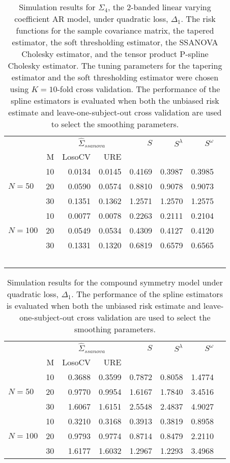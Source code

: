 \documentclass[12pt]{article}
\theoremstyle{definition}
\begin{document}
\begin{table}[H]
\centering
\caption{Simulation results for $\Sigma_4$, the 2-banded linear varying coefficient AR model, under quadratic loss, $\Delta_1$. The risk functions for the sample covariance matrix, the tapered estimator, the soft thresholding estimator, the SSANOVA Cholesky estimator, and the tensor product P-spline Cholesky estimator. The tuning parameters for the tapering estimator and the soft thresholding estimator were chosen using $K = 10$-fold cross validation. The performance of the spline estimators is evaluated when both the unbiased risk estimate and leave-one-subject-out cross validation are used to select the smoothing parameters.}
\begin{tabular}{l|r|rrrrrr}
&  & \multicolumn{2}{c}{$\hat{\Sigma}_{ssanova}$} & $S$ & $S^\lambda$ & $S^\omega$ \\ 
&M & \mbox{LosoCV} & \mbox{URE} &  \\ 
  \hline
 &    10 & 0.0134 &  0.0145	& 0.4169 & 0.3987 & 0.3985 \\ 
$N = 50$ &    20 & 0.0590 & 0.0574 & 0.8810& 0.9078 & 0.9073 \\ 
 &    30 & 0.1351 &  0.1362	& 1.2571  & 1.2570 & 1.2575\\ \hdashline
     &    10 & 0.0077 &  0.0078 & 0.2263  & 0.2111 & 0.2104 \\ 
  $N = 100$ &    20 & 0.0549 & 0.0534  & 0.4309 & 0.4127 & 0.4120 \\ 
   &    30 & 0.1331 & 0.1320 & 0.6819  & 0.6579 & 0.6565 \\\
\end{tabular}
\end{table}



\begin{table}[H]
\centering
\caption{Simulation results for the compound symmetry model under quadratic loss, $\Delta_1$. The performance of the spline estimators is evaluated when both the unbiased risk estimate and leave-one-subject-out cross validation are used to select the smoothing parameters.}
\begin{tabular}{l|r|rrrrrr}
&  & \multicolumn{2}{c}{$\hat{\Sigma}_{ssanova}$} & $S$ & $S^\lambda$ & $S^\omega$ \\ 
&M & \mbox{LosoCV} & \mbox{URE} &  \\ 
  \hline
 &    10 & 0.3688 & 0.3599	& 0.7872& 0.8058 & 1.4774 \\ 
$N = 50$ &    20 & 0.9770 &   0.9954	 & 1.6167& 1.7840 & 3.4516 \\ 
  &    30 & 1.6067 &	1.6151   &  2.5548 & 2.4837 & 4.9027 \\ \hdashline
  &    10 & 0.3210 & 0.3168 & 0.3913 & 0.3819 & 0.8958\\ 
  $N = 100$ &    20 & 0.9793 & 0.9774 &  0.8714 & 0.8479 & 2.2110\\ 
   &    30 & 1.6177 &  1.6032  & 1.2967  & 1.2293 & 3.4968\\ 
\end{tabular}
\end{table}



\end{document}
